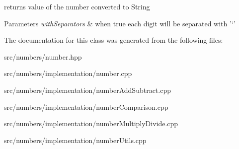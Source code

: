 returns value of the number converted to String 


\begin{DoxyParams}{Parameters}
{\em with\-Separators} & when true each digit will be separated with '`' \\
\hline
\end{DoxyParams}


The documentation for this class was generated from the following files\-:\begin{DoxyCompactItemize}
\item 
src/numbers/number.\-hpp\item 
src/numbers/implementation/number.\-cpp\item 
src/numbers/implementation/number\-Add\-Subtract.\-cpp\item 
src/numbers/implementation/number\-Comparison.\-cpp\item 
src/numbers/implementation/number\-Multiply\-Divide.\-cpp\item 
src/numbers/implementation/number\-Utils.\-cpp\end{DoxyCompactItemize}
